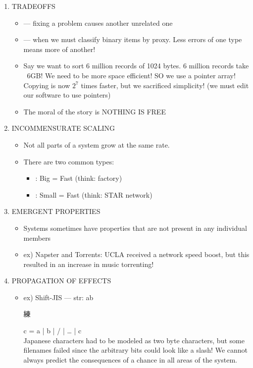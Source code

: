 \documentclass[../../lecture_notes.tex]{subfiles}
\begin{document}
\begin{enumerate}
\item TRADEOFFS
	\begin{itemize}
	\item {} --- fixing a problem causes another unrelated one
	\item {} --- when we must classify binary items by proxy.
		Less errors of one type means more of another!
	\item Say we want to sort 6 million records of 1024 bytes.
		6 million records take ~6GB!  We need to be more space efficient! SO we use a pointer array! 
		Copying is now $2^7$ times faster, but we sacrificed simplicity! 
		(we must edit our software to use pointers)
	\item The moral of the story is NOTHING IS FREE 
	\end{itemize}
\item INCOMMENSURATE SCALING
\begin{itemize}
	\item Not all parts of a system grow at the same rate.
	\item There are two common types: 
		\begin{itemize}
			\item{}: Big = Fast (think: factory)
			\item{}: Small = Fast (think: STAR network)
		\end{itemize}
	\end{itemize}
\item EMERGENT PROPERTIES
	\begin{itemize}
	\item Systems sometimes have properties that are not present in any individual members
	\item ex) Napster and Torrents: UCLA received a network speed boost, but this resulted in an increase in music torrenting!
	\end{itemize}
\item PROPAGATION OF EFFECTS
	\begin{itemize}
	\item ex) Shift-JIS --- str: ab\begin{CJK}{UTF8}{min}練\end{CJK}c = a | b | / | … | c\\
		Japanese characters had to be modeled as two byte characters, but some filenames failed since the arbitrary bits could look like a slash! We cannot always predict the consequences of a chance in all areas of the system.
	\end{itemize}
\end{enumerate}
\end{document}
